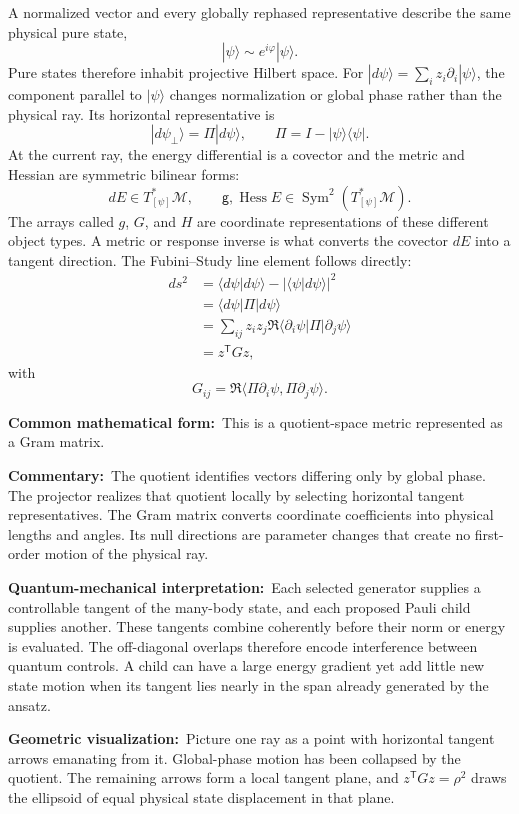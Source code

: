 \documentclass[10pt,twocolumn]{article}
\newcommand{\ket}[1]{|#1\rangle}
\newcommand{\bra}[1]{\langle #1|}
\newcommand{\form}[1]{\par\noindent\textbf{Common mathematical form:}\ #1\par}
\newcommand{\commentary}[1]{\par\noindent\textbf{Commentary:}\ #1\par}
\newcommand{\phys}[1]{\par\noindent\textbf{Quantum-mechanical interpretation:}\ #1\par}
\newcommand{\geom}[1]{\par\noindent\textbf{Geometric visualization:}\ \textcolor{teal!70!black}{#1}\par}
\begin{document}
A normalized vector and every globally rephased representative describe the
same physical pure state,
\[
\ket{\psi}\sim e^{i\varphi}\ket{\psi}.
\]
Pure states therefore inhabit projective Hilbert space. For
\(\ket{d\psi}=\sum_i z_i\partial_i\ket{\psi}\), the component parallel to
\(\ket{\psi}\) changes normalization or global phase rather than the physical
ray. Its horizontal representative is
\[
\ket{d\psi_\perp}=\Pi\ket{d\psi},
\qquad
\Pi=I-\ket{\psi}\bra{\psi}.
\]
At the current ray, the energy differential is a covector and the metric and
Hessian are symmetric bilinear forms:
\[
dE\in T_{[\psi]}^*\mathcal M,
\qquad
\mathsf g,\operatorname{Hess}E
\in\operatorname{Sym}^2(T_{[\psi]}^*\mathcal M).
\]
The arrays called \(g\), \(G\), and \(H\) are coordinate representations of
these different object types. A metric or response inverse is what converts
the covector \(dE\) into a tangent direction.
The Fubini--Study line element follows directly:
\begin{align*}
ds^2
&=\langle d\psi|d\psi\rangle
-|\langle\psi|d\psi\rangle|^2\\
&=\langle d\psi|\Pi|d\psi\rangle\\
&=\sum_{ij}z_i z_j
\Re\langle\partial_i\psi|\Pi|\partial_j\psi\rangle\\
&=z^{\mathsf T}Gz,
\end{align*}
with
\[
\boxed{G_{ij}=\Re\langle\Pi\partial_i\psi,
\Pi\partial_j\psi\rangle.}
\]

\form{This is a quotient-space metric represented as a Gram matrix.}

\commentary{The quotient identifies vectors differing only by global phase.
The projector realizes that quotient locally by selecting horizontal tangent
representatives. The Gram matrix converts coordinate coefficients into
physical lengths and angles. Its null directions are parameter changes that
create no first-order motion of the physical ray.}

\phys{Each selected generator supplies a controllable tangent of the many-body
state, and each proposed Pauli child supplies another. These tangents combine
coherently before their norm or energy is evaluated. The off-diagonal overlaps
therefore encode interference between quantum controls. A child can have a
large energy gradient yet add little new state motion when its tangent lies
nearly in the span already generated by the ansatz.}

\geom{Picture one ray as a point with horizontal tangent arrows emanating from
it. Global-phase motion has been collapsed by the quotient. The remaining
arrows form a local tangent plane, and \(z^{\mathsf T}Gz=\rho^2\) draws the
ellipsoid of equal physical state displacement in that plane.}
\end{document}
